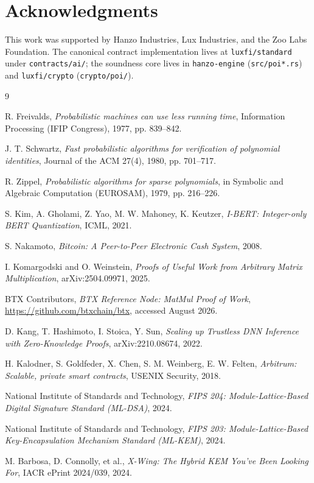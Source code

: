 \documentclass[11pt,a4paper]{article}
\begin{document}
\section*{Acknowledgments}

This work was supported by Hanzo Industries, Lux Industries, and the Zoo Labs Foundation. The canonical contract implementation lives at \texttt{luxfi/standard} under \texttt{contracts/ai/}; the soundness core lives in \texttt{hanzo-engine} (\texttt{src/poi*.rs}) and \texttt{luxfi/crypto} (\texttt{crypto/poi/}).

\begin{thebibliography}{9}

 R. Freivalds, \textit{Probabilistic machines can use less running time}, Information Processing (IFIP Congress), 1977, pp. 839--842.

 J. T. Schwartz, \textit{Fast probabilistic algorithms for verification of polynomial identities}, Journal of the ACM 27(4), 1980, pp. 701--717.

 R. Zippel, \textit{Probabilistic algorithms for sparse polynomials}, in Symbolic and Algebraic Computation (EUROSAM), 1979, pp. 216--226.

 S. Kim, A. Gholami, Z. Yao, M. W. Mahoney, K. Keutzer, \textit{I-BERT: Integer-only BERT Quantization}, ICML, 2021.

 S. Nakamoto, \textit{Bitcoin: A Peer-to-Peer Electronic Cash System}, 2008.

 I. Komargodski and O. Weinstein, \textit{Proofs of Useful Work from Arbitrary Matrix Multiplication}, arXiv:2504.09971, 2025.

 BTX Contributors, \textit{BTX Reference Node: MatMul Proof of Work}, \url{https://github.com/btxchain/btx}, accessed August 2026.

 D. Kang, T. Hashimoto, I. Stoica, Y. Sun, \textit{Scaling up Trustless DNN Inference with Zero-Knowledge Proofs}, arXiv:2210.08674, 2022.

 H. Kalodner, S. Goldfeder, X. Chen, S. M. Weinberg, E. W. Felten, \textit{Arbitrum: Scalable, private smart contracts}, USENIX Security, 2018.

 National Institute of Standards and Technology, \textit{FIPS 204: Module-Lattice-Based Digital Signature Standard (ML-DSA)}, 2024.

 National Institute of Standards and Technology, \textit{FIPS 203: Module-Lattice-Based Key-Encapsulation Mechanism Standard (ML-KEM)}, 2024.

 M. Barbosa, D. Connolly, et al., \textit{X-Wing: The Hybrid KEM You've Been Looking For}, IACR ePrint 2024/039, 2024.

\end{thebibliography}
\end{document}
